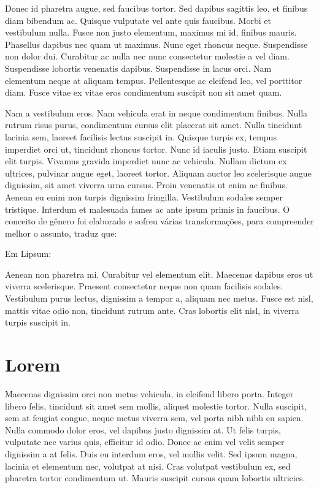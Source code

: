\documentclass[
	12pt,				%
	a4paper,			%
    openany,
    oneside,
	english,			%
	french,				%
	spanish,			%
	brazil,				%
	]{abntex2}
\begin{document}
\begin{citacao}
\par Donec id pharetra augue, sed faucibus tortor. Sed dapibus sagittis leo, et finibus diam bibendum ac. Quisque vulputate vel ante quis faucibus. Morbi et vestibulum nulla. Fusce non justo elementum, maximus mi id, finibus mauris. Phasellus dapibus nec quam ut maximus. Nunc eget rhoncus neque. Suspendisse non dolor dui. Curabitur ac nulla nec nunc consectetur molestie a vel diam. Suspendisse lobortis venenatis dapibus. Suspendisse in lacus orci. Nam elementum neque at aliquam tempus. Pellentesque ac eleifend leo, vel porttitor diam. Fusce vitae ex vitae eros condimentum suscipit non sit amet quam.
\end{citacao}

Nam a vestibulum eros. Nam vehicula erat in neque condimentum finibus. Nulla rutrum risus purus, condimentum cursus elit placerat sit amet. Nulla tincidunt lacinia sem, laoreet facilisis lectus suscipit in. Quisque turpis ex, tempus imperdiet orci ut, tincidunt rhoncus tortor. Nunc id iaculis justo. Etiam suscipit elit turpis. Vivamus gravida imperdiet nunc ac vehicula. Nullam dictum ex ultrices, pulvinar augue eget, laoreet tortor. Aliquam auctor leo scelerisque augue dignissim, sit amet viverra urna cursus. Proin venenatis ut enim ac finibus. Aenean eu enim non turpis dignissim fringilla. Vestibulum sodales semper tristique. Interdum et malesuada fames ac ante ipsum primis in faucibus. 
O conceito de gênero foi elaborado e sofreu várias transformações, para compreender melhor o assunto, \cite{beauvoir:15} traduz que:

Em Lipsum:

\begin{citacao}
\par Aenean non pharetra mi. Curabitur vel elementum elit. Maecenas dapibus eros ut viverra scelerisque. Praesent consectetur neque non quam facilisis sodales. Vestibulum purus lectus, dignissim a tempor a, aliquam nec metus. Fusce est nisl, mattis vitae odio non, tincidunt rutrum ante. Cras lobortis elit nisl, in viverra turpis suscipit in.
\end{citacao}

\section{Lorem}

 Maecenas dignissim orci non metus vehicula, in eleifend libero porta. Integer libero felis, tincidunt sit amet sem mollis, aliquet molestie tortor. Nulla suscipit, sem at feugiat congue, neque metus viverra sem, vel porta nibh nibh eu sapien. Nulla commodo dolor eros, vel dapibus justo dignissim at. Ut felis turpis, vulputate nec varius quis, efficitur id odio. Donec ac enim vel velit semper dignissim a at felis. Duis eu interdum eros, vel mollis velit. Sed ipsum magna, lacinia et elementum nec, volutpat at nisi. Cras volutpat vestibulum ex, sed pharetra tortor condimentum ut. Mauris suscipit cursus quam lobortis ultricies.
\end{document}
